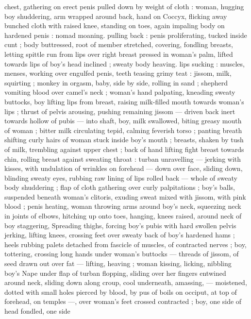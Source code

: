 chest, gathering on erect penis pulled down by weight of cloth : 
woman, hugging boy shuddering, arm wrapped around back, hand on 
Coccyx, flicking away bunched cloth with raised knee, standing on 
toes, again impaling body on hardened penis : nomad moaning. 
pulling back : penis proliferating, tucked inside cunt ; body 
buttressed, root of member stretched, covering, fondling breasts, 
letting spittle run from lips over right breast pressed in woman's 
palm, lifted towards lips of boy's head inclined ; sweaty body 
heaving. lips sucking : muscles, menses, working over engulfed 
penis, teeth teasing grimy teat : jissom, milk, squirting ; monkey in 
orgasm, baby, side by side, rolling in sand ; shepherd vomiting blood 
over camel's neck ; woman's hand palpating, kneading sweaty 
buttocks, boy lifting lips from breast, raising milk-filled mouth 
towards woman's lips ; thrust of pelvis arousing, pushing remaining 
jissom --- driven back inert towards hollow of pubis --- into shaft, 
boy, milk swallowed, biting greasy mouth of woman ; bitter milk 
circulating tepid, calming feverish torso ; panting breath shifting 
curly hairs of woman stuck inside boy's mouth ; breasts, shaken by 
tush of milk, trembling against upper chest ; back of hand lifting 
fight breast towards chin, rolling breast against sweating throat : 
turban unravelling --- jerking with kisses, with undulation of wrinkles 
on forehead --- down over face, sliding down, blinding sweaty eyes, 
rubbing raw lining of lips rolled back --- whole of sweaty body 
shuddering ; flap of cloth gathering over curly palpitations ; boy's 
balls, suspended beneath woman's clitoris, exuding sweat mixed with 
jissom, with pink blood ; penis heating, woman throwing arms around 
boy's neck, squeezing neck in joints of elbows, hitching up onto 
toes, hanging, knees raised, around neck of boy staggering, 
Spreading thighs, forcing boy's pubis with hard swollen pelvis 
jerking, lifting knees, crossing feet over sweaty back of boy's 
hardened hams ; heels rubbing palets detached from fascicle of 
muscles, of contracted nerves ; boy, tottering, crossing long hands 
under woman's buttocks --- threads of jissom, of seed drawn out 
over fat --- lifting, heaving ; woman kissing, licking, nibbling boy's 
Nape under flap of turban flopping, sliding over her fingers entwined 
around neck, sliding down along croup, cool underneath, amassing, 
--- moistened, dotted with small holes pierced by blood, by pus of 
boils on occiput, at top of forehead, on temples ---, over woman's 
feet crossed contracted ; boy, one side of head fondled, one side 
